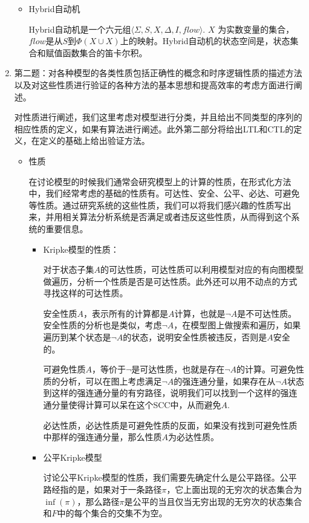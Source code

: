 \documentclass[UTF-8]{ctexart}
\begin{document}
\begin{enumerate}
\begin{itemize}
\item Hybrid自动机

Hybrid自动机是一个六元组$\langle \Sigma, S, X, \Delta, I, flow\rangle$. $X$ 为实数变量的集合，$flow$是从$S$到$\Phi(X\cup X)$上的映射。Hybrid自动机的状态空间是，状态集合和赋值函数集合的笛卡尔积。

\end{itemize}


\item 第二题：对各种模型的各类性质包括正确性的概念和时序逻辑性质的描述方法以及对这些性质进行验证的各种方法的基本思想和提高效率的考虑方面进行阐述。

对性质进行阐述，我们这里考虑对模型进行分类，并且给出不同类型的序列的相应性质的定义，如果有算法进行阐述。此外第二部分将给出LTL和CTL的定义，在定义的基础上给出验证方法。

\begin{itemize}
\item 性质

在讨论模型的时候我们通常会研究模型上的计算的性质，在形式化方法中，我们经常考虑的基础的性质有。可达性、安全、公平、必达、可避免等性质。通过研究系统的这些性质，我们可以将我们感兴趣的性质写出来，并用相关算法分析系统是否满足或者违反这些性质，从而得到这个系统的重要信息。

\begin{itemize}
\item Kripke模型的性质：

对于状态子集$A$的可达性质，可达性质可以利用模型对应的有向图模型做遍历，分析一个性质是否是可达性质。此外还可以用不动点的方式寻找这样的可达性质。

安全性质$A$，表示所有的计算都是$A$计算，也就是$\neg A$是不可达性质。安全性质的分析也是类似，考虑$\neg A$，在模型图上做搜索和遍历，如果遍历到某个状态是$\neg A$的状态，说明安全性质被违反，否则是$A$安全的。

可避免性质$A$，等价于$\neg$是可达性质，也就是存在$\neg A$的计算。可避免性质的分析，可以在图上考虑满足$\neg A$的强连通分量，如果存在从$\neg A$状态到这样的强连通分量的有穷路径，说明我们可以找到一个这样的强连通分量使得计算可以呆在这个SCC中，从而避免$A$.

必达性质，必达性质是可避免性质的反面，如果没有找到可避免性质中那样的强连通分量，那么性质$A$为必达性质。

\item 公平Kripke模型

讨论公平Kripke模型的性质，我们需要先确定什么是公平路径。公平路经指的是，如果对于一条路径$\pi$，它上面出现的无穷次的状态集合为$\inf(\pi)$，那么路径$\pi$是公平的当且仅当无穷出现的无穷次的状态集合和$F$中的每个集合的交集不为空。


\end{itemize}
\end{itemize}
\end{enumerate}
\end{document}
